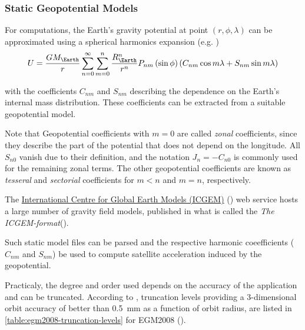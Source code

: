 \subsubsection{Static Geopotential Models}
For computations, the Earth's gravity potential at point $(r, \phi , \lambda )$
can be approximated using a spherical harmonics expansion 
(e.g. \cite{Montenbruck2000})
\begin{equation}
    U = \frac{G M_{\Earth}}{r} \sum_{n=0}^\infty \sum_{m=0}^n 
    \frac{R_{\Earth}^n}{r^n} P_{nm} \left( \sin \phi \right) 
    \left( C_{nm} \cos{m\lambda} + S_{nm} \sin{m\lambda} \right)
\end{equation}

with the coefficients \(C_{nm}\) and \(S_{nm}\) describing the dependence on the 
Earth's internal mass distribution. These coefficients can be extracted from a 
suitable geopotential model.

Note that Geopotential coefficients with \(m=0\) are called  \emph{zonal} coefficients, 
since they describe the part of the potential that does not depend on the longitude. 
All \(S_{n0}\) vanish due to their definition, and the notation \(J_n = -C_{n0}\) 
is commonly used for the remaining zonal terms. The other geopotential coefficients
are known as \emph{tesseral} and \emph{sectorial} coefficients for \(m<n\) and 
\(m = n\), respectively.


The \href{http://icgem.gfz-potsdam.de/home}{International Centre for Global Earth Models (ICGEM)}  
(\cite{icgempub}) web service hosts a large number of gravity field models, 
published in what is called the \emph{The ICGEM-format}(\cite{ICGEMFormat}). 

Such static model files can be parsed and the respective harmonic coeefficients 
(\(C_{nm}\) and \(S_{nm}\)) be used to compute satellite acceleration induced by 
the geopotential.

Practicaly, the degree and order used depends on the accuracy of the 
application and can be truncated. According to \cite{iers2010}, truncation levels 
providing a 3-dimensional orbit accuracy of better than \SI{0.5}{\mm} as a 
function of orbit radius, are listed in \ref{table:egm2008-truncation-levels} 
for EGM2008 (\cite{pavlisegm08}).

